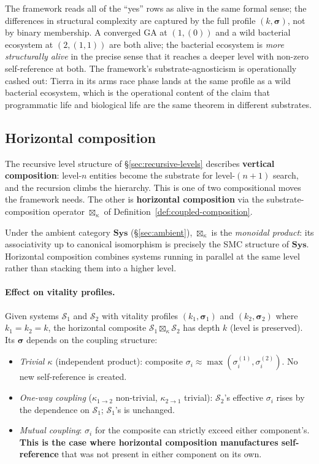 \documentclass[journal]{IEEEtran}
\theoremstyle{plain}
\theoremstyle{definition}
\theoremstyle{plain}
\begin{document}
The framework reads all of the ``yes'' rows as alive in the same
formal sense; the differences in structural complexity are captured
by the full profile $(k, \boldsymbol{\sigma})$, not by binary
membership. A converged GA at $(1, (0))$ and a wild bacterial
ecosystem at $(2, (1, 1))$ are both alive; the bacterial ecosystem is
\emph{more structurally alive} in the precise sense that it reaches a
deeper level with non-zero self-reference at both. The framework's
substrate-agnosticism is operationally cashed out: Tierra in its arms
race phase lands at the same profile as a wild bacterial ecosystem,
which is the operational content of the claim that programmatic life
and biological life are the same theorem in different substrates.

\subsection{Horizontal composition}\label{sec:horizontal}

The recursive level structure of \S\ref{sec:recursive-levels} describes
\textbf{vertical composition}: level-$n$ entities become the substrate for
level-$(n{+}1)$ search, and the recursion climbs the hierarchy. This is
one of two compositional moves the framework needs. The other is
\textbf{horizontal composition} via the substrate-composition operator
$\boxtimes_\kappa$ of Definition~\ref{def:coupled-composition}.

Under the ambient category $\mathbf{Sys}$ (\S\ref{sec:ambient}),
$\boxtimes_\kappa$ is the \emph{monoidal product}: its associativity
up to canonical isomorphism is precisely the SMC structure of
$\mathbf{Sys}$. Horizontal composition combines systems running in
parallel at the same level rather than stacking them into a higher
level.

\paragraph{Effect on vitality profiles.}
Given systems $\mathcal{S}_1$ and $\mathcal{S}_2$ with vitality profiles
$(k_1, \boldsymbol{\sigma}_1)$ and $(k_2, \boldsymbol{\sigma}_2)$ where
$k_1 = k_2 = k$, the horizontal composite $\mathcal{S}_1
\boxtimes_\kappa \mathcal{S}_2$ has depth $k$ (level is preserved). Its
$\boldsymbol{\sigma}$ depends on the coupling structure:

\begin{itemize}[leftmargin=1.5em,itemsep=2pt]
  \item \emph{Trivial $\kappa$} (independent product): composite $\sigma_i
    \approx \max(\sigma_i^{(1)}, \sigma_i^{(2)})$. No new self-reference
    is created.
  \item \emph{One-way coupling} ($\kappa_{1 \to 2}$ non-trivial,
    $\kappa_{2 \to 1}$ trivial): $\mathcal{S}_2$'s effective $\sigma_i$
    rises by the dependence on $\mathcal{S}_1$; $\mathcal{S}_1$'s is
    unchanged.
  \item \emph{Mutual coupling}: $\sigma_i$ for the composite can
    strictly exceed either component's. \textbf{This is the case where
    horizontal composition manufactures self-reference} that was not
    present in either component on its own.
\end{itemize}
\end{document}
